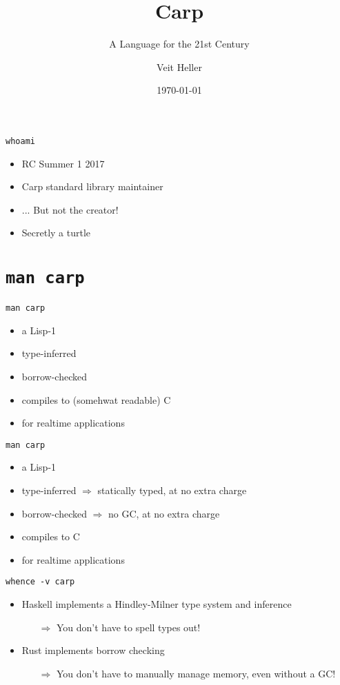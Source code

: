 \documentclass[aspectratio=169]{beamer}
\title{Carp}
\subtitle{A Language for the 21st Century}
\date{\today}
\author{Veit Heller}
\institute{Localhost | Recurse Center}
\begin{document}
  \maketitle
  \begin{frame}{\texttt{whoami}}
    \begin{itemize}
      \item RC Summer 1 2017
      \item Carp standard library maintainer
      \item ... But not the creator!
      \item Secretly a turtle
    \end{itemize}
  \end{frame}
  \section{\texttt{man carp}}
  \begin{frame}{\texttt{man carp}}
    \begin{itemize}
      \item a Lisp-1
      \item type-inferred
      \item borrow-checked
      \item compiles to (somehwat readable) C
      \item for realtime applications
    \end{itemize}
  \end{frame}
  \begin{frame}{\texttt{man carp}}
    \begin{itemize}
      \item a Lisp-1
      \item type-inferred $\Rightarrow$ statically typed, at no extra charge
      \item borrow-checked $\Rightarrow$ no GC, at no extra charge
      \item compiles to C
      \item for realtime applications
    \end{itemize}
  \end{frame}
  \begin{frame}{\texttt{whence -v carp}}
    \begin{itemize}
      \item Haskell implements a Hindley-Milner type system and inference
      \begin{itemize}
        \item[$\Rightarrow$] You don’t have to spell types out!
      \end{itemize}
      \item Rust implements borrow checking
      \begin{itemize}
        \item[$\Rightarrow$] You don’t have to manually manage memory, even without a GC!
      \end{itemize}
    \end{itemize}
  \end{frame}
\end{document}
